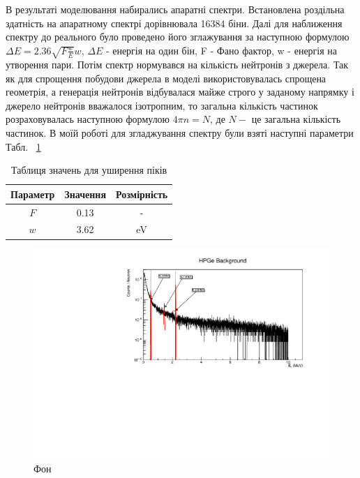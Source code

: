 \documentclass[a4paper, 14pt]{article}
\numberwithin{equation}{section}
\numberwithin{table}{section}
\begin{document}
В результаті моделювання набирались апаратні спектри. Встановлена роздільна здатність на апаратному спектрі дорівнювала 16384 біни. Далі для наближення спектру до реального було проведено його зглажування за наступною формулою $\Delta{E} = 2.36 \sqrt{F  \frac{w}{E}}  w$, $\Delta{E}$ - енергія на один бін, F - Фано фактор, w - енергія на утворення пари. Потім спектр нормувався на кількість нейтронів з джерела. Так як для спрощення побудови джерела в моделі використовувалась спрощена геометрія, а генерація нейтронів відбувалася майже строго у заданому напрямку і джерело нейтронів вважалося ізотропним, то загальна кількість частинок розраховувалась наступною формулою $ 4 \pi n = N$, де $N -$ це загальна кількість частинок. В моїй роботі для згладжування спектру були взяті наступні параметри Табл. ~\ref{tabl:Param}
\begin{table}[h]
	\centering
	\caption{Таблиця значень для уширення піків} 
	\begin{tabular}{|c|c|c|} 
		\hline
		Параметр & Значення &  Розмірність \\
		\hline
		$F$ & 0.13 & - \\
		\hline
		$w$ & 3.62 & eV \\		
		\hline
	\end{tabular}
	\label{tabl:Param}
\end{table}
\begin{figure}[hbt!]
	\centering \includegraphics[width=1\textwidth]{res/background.pdf}
	\caption{Фон} 
	\label{ris:FonPicks}	
\end{figure} 
\end{document}
